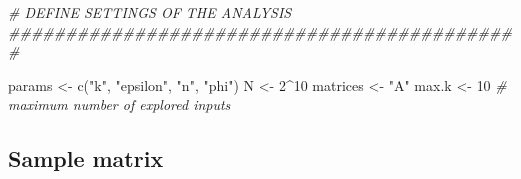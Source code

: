 \documentclass[
  11pt,
]{article}
\newenvironment{Shaded}{\begin{snugshade}}{\end{snugshade}}
\newcommand{\CommentTok}[1]{\textcolor[rgb]{0.56,0.35,0.01}{\textit{#1}}}
\newcommand{\DecValTok}[1]{\textcolor[rgb]{0.00,0.00,0.81}{#1}}
\newcommand{\FunctionTok}[1]{\textcolor[rgb]{0.00,0.00,0.00}{#1}}
\newcommand{\NormalTok}[1]{#1}
\newcommand{\OtherTok}[1]{\textcolor[rgb]{0.56,0.35,0.01}{#1}}
\newcommand{\SpecialCharTok}[1]{\textcolor[rgb]{0.00,0.00,0.00}{#1}}
\newcommand{\StringTok}[1]{\textcolor[rgb]{0.31,0.60,0.02}{#1}}
\begin{document}
\begin{Shaded}
\begin{Highlighting}[]
\CommentTok{\# DEFINE SETTINGS OF THE ANALYSIS \#\#\#\#\#\#\#\#\#\#\#\#\#\#\#\#\#\#\#\#\#\#\#\#\#\#\#\#\#\#\#\#\#\#\#\#\#\#\#\#\#\#\#\#\#}

\NormalTok{params }\OtherTok{\textless{}{-}} \FunctionTok{c}\NormalTok{(}\StringTok{"k"}\NormalTok{, }\StringTok{"epsilon"}\NormalTok{, }\StringTok{"n"}\NormalTok{, }\StringTok{"phi"}\NormalTok{)}
\NormalTok{N }\OtherTok{\textless{}{-}} \DecValTok{2}\SpecialCharTok{\^{}}\DecValTok{10}
\NormalTok{matrices }\OtherTok{\textless{}{-}} \StringTok{"A"}
\NormalTok{max.k }\OtherTok{\textless{}{-}} \DecValTok{10} \CommentTok{\# maximum number of explored inputs}
\end{Highlighting}
\end{Shaded}

\hypertarget{sample-matrix}{%
\subsection{Sample matrix}\label{sample-matrix}}
\end{document}
